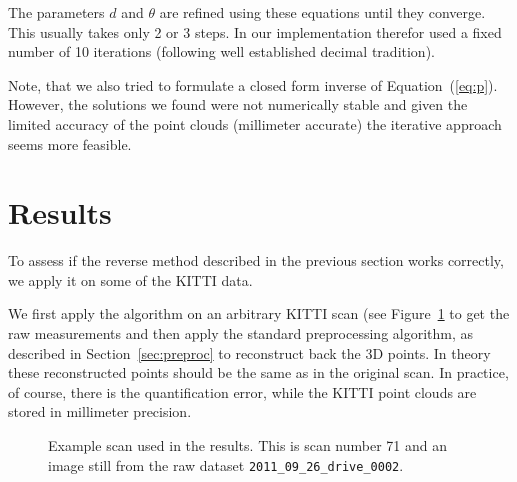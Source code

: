 \documentclass[english]{article}
\begin{document}

The parameters $d$ and $\theta$ are refined using these equations until they
converge. This usually takes only 2 or 3 steps. In our implementation therefor
used a fixed number of 10 iterations (following well established decimal
tradition).

Note, that we also tried to formulate a closed form inverse of
Equation~(\ref{eq:p}). However, the solutions we found were not
numerically stable and given the limited accuracy of the point clouds
(millimeter accurate) the iterative approach seems more feasible.

\section{Results}
To assess if the reverse method described in the previous section works
correctly, we apply it on some of the KITTI data.

We first apply the algorithm on an arbitrary KITTI scan (see Figure~\ref{fig:example} to get the raw measurements and then
apply the standard preprocessing algorithm, as described in
Section~\ref{sec:preproc} to reconstruct back the 3D points. In theory these
reconstructed points should be the same as in the original scan. In practice, of
course, there is the quantification error, while the KITTI point clouds are
stored in millimeter precision.

\begin{figure}
  \begin{center}
      \caption{Example scan used in the results. This is scan number 71 and an
      image still from the raw dataset \texttt{2011\_09\_26\_drive\_0002}.}
  \label{fig:example}
  \end{center}
\end{figure}
\end{document}

